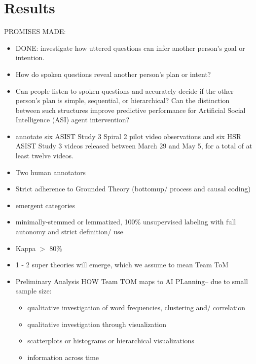 \documentclass[10pt]{article}
\begin{document}
\newpage







\section{Results}












PROMISES MADE:

\begin{itemize}
    \item DONE: investigate how uttered questions can infer another person's goal or intention. 
    

    \item How do spoken questions reveal another person’s plan or intent? 
    \item Can people listen to spoken questions and accurately decide if the other person's plan
        is simple, sequential, or hierarchical? Can the distinction between such
        structures improve predictive performance for Artificial Social
        Intelligence (ASI) agent intervention?
    \item  annotate six ASIST Study 3 Spiral 2 pilot video observations and
six HSR ASIST Study 3 videos released between March 29 and May 5, for a total
of at least twelve videos. 
    \item Two human annotators
    \item Strict adherence to Grounded Theory (bottomup/ process and causal coding)
    \item emergent categories
    \item minimally-stemmed or lemmatized, 100\% unsupervised labeling with full autonomy and strict definition/ use
    \item Kappa $>$ 80\%
    \item 1 - 2 super theories will emerge, which we assume to mean Team ToM
    \item Preliminary Analysis HOW Team TOM maps to AI PLanning-- due to small sample size:
    \begin{itemize}
        \item qualitative investigation of word frequencies, clustering and/ correlation
        \item qualitative investigation through visualization
        \item scatterplots or histograms or hierarchical visualizations
        \item information across time
    \end{itemize}
 \end{itemize}
\end{document}
